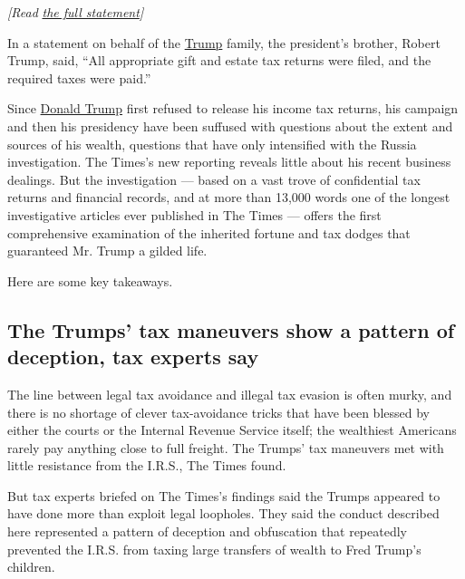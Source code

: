 \emph{{[}Read}
\href{https://int.nyt.com/data/documenthelper/353-trump-inheritance-taxes-statement/2986a100d3d19a917cdc/optimized/full.pdf\#page=1?action=click\&module=Intentional\&pgtype=Article}{\emph{the
full statement}}\emph{{]}}

In a statement on behalf of the
\href{https://www.nytimes.com/interactive/2019/05/07/us/politics/donald-trump-taxes.html}{Trump}
family, the president's brother, Robert Trump, said, ``All appropriate
gift and estate tax returns were filed, and the required taxes were
paid.''

Since
\href{https://www.nytimes.com/interactive/2018/10/02/us/politics/donald-trump-tax-schemes-fred-trump.html}{Donald
Trump} first refused to release his income tax returns, his campaign and
then his presidency have been suffused with questions about the extent
and sources of his wealth, questions that have only intensified with the
Russia investigation. The Times's new reporting reveals little about his
recent business dealings. But the investigation --- based on a vast
trove of confidential tax returns and financial records, and at more
than 13,000 words one of the longest investigative articles ever
published in The Times --- offers the first comprehensive examination of
the inherited fortune and tax dodges that guaranteed Mr. Trump a gilded
life.

Here are some key takeaways.

\hypertarget{the-trumps-tax-maneuvers-show-a-pattern-of-deception-tax-experts-say}{%
\subsection{The Trumps' tax maneuvers show a pattern of deception, tax
experts
say}\label{the-trumps-tax-maneuvers-show-a-pattern-of-deception-tax-experts-say}}

The line between legal tax avoidance and illegal tax evasion is often
murky, and there is no shortage of clever tax-avoidance tricks that have
been blessed by either the courts or the Internal Revenue Service
itself; the wealthiest Americans rarely pay anything close to full
freight. The Trumps' tax maneuvers met with little resistance from the
I.R.S., The Times found.

But tax experts briefed on The Times's findings said the Trumps appeared
to have done more than exploit legal loopholes. They said the conduct
described here represented a pattern of deception and obfuscation that
repeatedly prevented the I.R.S. from taxing large transfers of wealth to
Fred Trump's children.


